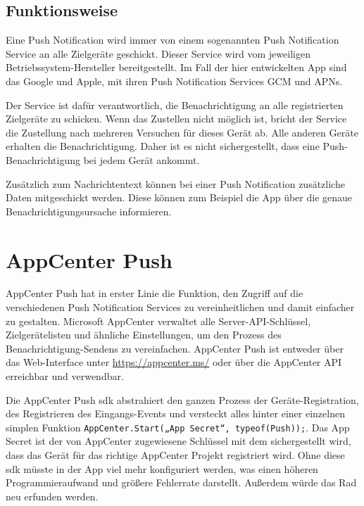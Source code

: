 \subsection{Funktionsweise}
Eine Push Notification wird immer von einem sogenannten Push Notification Service an alle Zielgeräte geschickt.
Dieser Service wird vom jeweiligen Betriebssystem-Hersteller bereitgestellt.
Im Fall der hier entwickelten App sind das Google und Apple, mit ihren Push Notification Services GCM und APNs.\par

Der Service ist dafür verantwortlich, die Benachrichtigung an alle registrierten Zielgeräte zu schicken.
Wenn das Zustellen nicht möglich ist, bricht der Service die Zustellung nach mehreren Versuchen für dieses Gerät ab.
Alle anderen Geräte erhalten die Benachrichtigung.
Daher ist es nicht sichergestellt, dass eine Push-Benachrichtigung bei jedem Gerät ankommt.\par

Zusätzlich zum Nachrichtentext können bei einer Push Notification zusätzliche Daten mitgeschickt werden. Diese können zum Beispiel die App über die genaue Benachrichtigungsursache informieren.

\section{AppCenter Push}
AppCenter Push hat in erster Linie die Funktion, den Zugriff auf die verschiedenen Push Notification Services zu vereinheitlichen und damit einfacher zu gestalten.
Microsoft AppCenter verwaltet alle Server-API-Schlüssel, Zielgerätelisten und ähnliche Einstellungen, um den Prozess des Benachrichtigung-Sendens zu vereinfachen.
AppCenter Push ist entweder über das Web-Interface unter \url{https://appcenter.ms/} oder über die AppCenter API erreichbar und verwendbar.\par

Die AppCenter Push \ac{sdk} abstrahiert den ganzen Prozess der Geräte-Registration, des Registrieren des Eingangs-Events und versteckt alles hinter einer einzelnen simplen Funktion \texttt{AppCenter.Start(„{App Secret}“, typeof(Push));}. Das App Secret ist der von AppCenter zugewiesene Schlüssel mit dem sichergestellt wird, dass das Gerät für das richtige AppCenter Projekt registriert wird.
Ohne diese \ac{sdk} müsste in der App viel mehr konfiguriert werden, was einen höheren Programmieraufwand und größere Fehlerrate darstellt. Außerdem würde das Rad neu erfunden werden.\par

